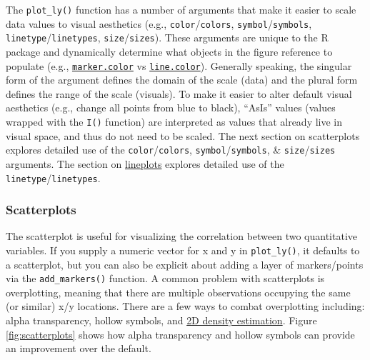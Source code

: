 \documentclass[12pt,]{isuthesis}
\newenvironment{Shaded}{\begin{snugshade}}{\end{snugshade}}
\newcommand{\KeywordTok}[1]{\textcolor[rgb]{0.13,0.29,0.53}{\textbf{{#1}}}}
\newcommand{\DataTypeTok}[1]{\textcolor[rgb]{0.13,0.29,0.53}{{#1}}}
\newcommand{\DecValTok}[1]{\textcolor[rgb]{0.00,0.00,0.81}{{#1}}}
\newcommand{\FloatTok}[1]{\textcolor[rgb]{0.00,0.00,0.81}{{#1}}}
\newcommand{\StringTok}[1]{\textcolor[rgb]{0.31,0.60,0.02}{{#1}}}
\newcommand{\NormalTok}[1]{{#1}}
\begin{document}
The \texttt{plot\_ly()} function has a number of arguments that make it
easier to scale data values to visual aesthetics (e.g.,
\texttt{color}/\texttt{colors}, \texttt{symbol}/\texttt{symbols},
\texttt{linetype}/\texttt{linetypes}, \texttt{size}/\texttt{sizes}).
These arguments are unique to the R package and dynamically determine
what objects in the figure reference to populate (e.g.,
\href{https://plot.ly/r/reference/\#scatter-marker-color}{\texttt{marker.color}}
vs \href{https://plot.ly/r/reference/\#scatter}{\texttt{line.color}}).
Generally speaking, the singular form of the argument defines the domain
of the scale (data) and the plural form defines the range of the scale
(visuals). To make it easier to alter default visual aesthetics (e.g.,
change all points from blue to black), ``AsIs'' values (values wrapped
with the \texttt{I()} function) are interpreted as values that already
live in visual space, and thus do not need to be scaled. The next
section on scatterplots explores detailed use of the
\texttt{color}/\texttt{colors}, \texttt{symbol}/\texttt{symbols}, \&
\texttt{size}/\texttt{sizes} arguments. The section on
\protect\hyperlink{line-plots}{lineplots} explores detailed use of the
\texttt{linetype}/\texttt{linetypes}.

\hypertarget{scatterplots}{\subsubsection{Scatterplots}\label{scatterplots}}

The scatterplot is useful for visualizing the correlation between two
quantitative variables. If you supply a numeric vector for x and y in
\texttt{plot\_ly()}, it defaults to a scatterplot, but you can also be
explicit about adding a layer of markers/points via the
\texttt{add\_markers()} function. A common problem with scatterplots is
overplotting, meaning that there are multiple observations occupying the
same (or similar) x/y locations. There are a few ways to combat
overplotting including: alpha transparency, hollow symbols, and
\protect\hyperlink{rectangular-binning-in-R}{2D density estimation}.
Figure \ref{fig:scatterplots} shows how alpha transparency and hollow
symbols can provide an improvement over the default.

\begin{Shaded}
\end{Shaded}
\end{document}

